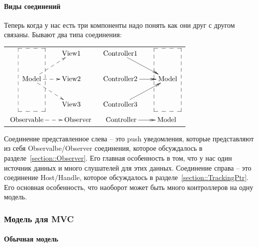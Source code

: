\paragraph{Виды соединений}

Теперь когда у нас есть три компоненты надо понять как они друг с другом связаны.
Бывают два типа соединения:
\begin{center}
\begin{tabular}{cc}
{
$
\xymatrix{
  {\phantom{\text{Model}}}
  {\save
  [].[dd]*+[F--]\frm{}
  \restore
  } 
  &{\text{View1}}\\
  {\text{Model}}\ar@{-->}[ru]\ar@{-->}[r]\ar@{-->}[rd]&{\text{View2}}\\
  {}&{\text{View3}}\\
}
$
}
&
{
$
\xymatrix{
  {\text{Controller1}}\ar@{->>}[rd]&  {\phantom{\text{Model}}}
  {\save
  [].[dd]*+[F--]\frm{}
  \restore
  }
  \\
  {\text{Controller2}}\ar@{->>}[r]&{\text{Model}}\\
  {\text{Controller3}}\ar@{->>}[ru]&{}\\
}
$
}\vspace{0.5cm}\\
{
$
\xymatrix{
  {\text{Observable}}\ar@{-->}[r]&{\text{Observer}}
}
$
}
&
{
$
\xymatrix{
  {\text{Controller}}\ar@{->>}[r]&{\text{Model}}
}
$
}
\end{tabular}
\end{center}
Соединение представленное слева -- это push уведомления, которые представляют из себя Observalbe/Observer соединения, которое обсуждалось в разделе~\ref{section::Observer}.
Его главная особенность в том, что у нас один источник данных и много слушателей для этих данных.
Соединение справа -- это соединение Host/Handle, которое обсуждалось в разделе~\ref{section::TrackingPtr}.
Его основная особенность, что наоборот может быть много контроллеров на одну модель.

\subsubsection{Модель для MVC}

\paragraph{Обычная модель}

